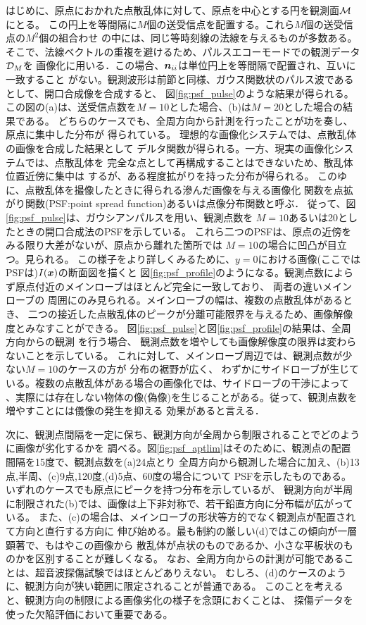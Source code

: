 \documentclass[10pt,a4j,dvipdfmx]{jarticle}
\begin{document}
はじめに、原点におかれた点散乱体に対して、原点を中心とする円を観測面${\cal M}$にとる。
この円上を等間隔に$M$個の送受信点を配置する。これら$M$個の送受信点の$M^2$個の組合わせ
の中には、同じ等時刻線の法線を与えるものが多数ある。
そこで、法線ベクトルの重複を避けるため、パルスエコーモードでの観測データ${\cal D}_M$を
画像化に用いる．この場合、$\mbox{\boldmath $n$}_{ii}$は単位円上を等間隔で配置され、互いに一致すること
がない。観測波形は前節と同様、ガウス関数状のパルス波であるとして、開口合成像を合成すると、
図\ref{fig:psf_pulse}のような結果が得られる。
この図の(a)は、送受信点数を$M=10$とした場合、(b)は$M=20$とした場合の結果である。
どちらのケースでも、全周方向から計測を行ったことが功を奏し、原点に集中した分布が
得られている。
理想的な画像化システムでは、点散乱体の画像を合成した結果として
デルタ関数が得られる。一方、現実の画像化システムでは、点散乱体を
完全な点として再構成することはできないため、散乱体位置近傍に集中は
するが、ある程度拡がりを持った分布が得られる。
このゆに、点散乱体を撮像したときに得られる滲んだ画像を与える画像化
関数を点拡がり関数(PSF:point spread function)あるいは点像分布関数と呼ぶ．
従って、図\ref{fig:psf_pulse}は、ガウシアンパルスを用い、観測点数を
$M=10$あるいは20としたときの開口合成法のPSFを示している。
これら二つのPSFは、原点の近傍をみる限り大差がないが、原点から離れた箇所では
$M=10$の場合に凹凸が目立つ。見られる。
この様子をより詳しくみるために、$y=0$における画像(ここではPSFは)$I(\mbox{\boldmath $x$})$の断面図を描くと
図\ref{fig:psf_profile}のようになる。観測点数によらず原点付近のメインローブはほとんど完全に一致しており、
両者の違いメインローブの 周囲にのみ見られる。メインローブの幅は、複数の点散乱体があるとき、
二つの接近した点散乱体のピークが分離可能限界を与えるため、画像解像度とみなすことができる。
図\ref{fig:psf_pulse}と図\ref{fig:psf_profile}の結果は、全周方向からの観測 を行う場合、
観測点数を増やしても画像解像度の限界は変わらないことを示している。 
これに対して、メインローブ周辺では、観測点数が少ない$M=10$のケースの方が 分布の裾野が広く、
わずかにサイドローブが生じている。複数の点散乱体がある場合の画像化では、サイドローブの干渉によって
、実際には存在しない物体の像(偽像)を生じることがある。従って、観測点数を増やすことには儀像の発生を抑える
効果があると言える．

次に、観測点間隔を一定に保ち、観測方向が全周から制限されることでどのように画像が劣化するかを
調べる。図\ref{fig:psf_aptlim}はそのために、観測点の配置間隔を15度で、観測点数を(a)24点とり
全周方向から観測した場合に加え、(b)13点,半周、(c)9点,120度,(d)5点、60度の場合について
PSFを示したものである。いずれのケースでも原点にピークを持つ分布を示しているが、
観測方向が半周に制限された(b)では、画像は上下非対称で、若干鉛直方向に分布幅が広がっている。
また、(c)の場合は、メインローブの形状等方的でなく観測点が配置されて方向と直行する方向に
伸び始める。最も制約の厳しい(d)ではこの傾向が一層顕著で、もはやこの画像から
散乱体が点状のものであるか、小さな平板状のものかを区別することが難しくなる。
なお、全周方向からの計測が可能であることは、超音波探傷試験ではほとんどありえない。
むしろ、(d)のケースのように、観測方向が狭い範囲に限定されることが普通である。
このことを考えると、観測方向の制限による画像劣化の様子を念頭におくことは、
探傷データを使った欠陥評価において重要である。
\end{document}
